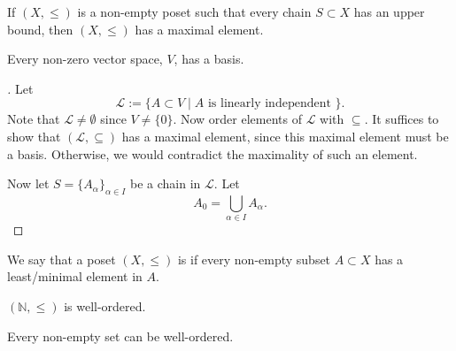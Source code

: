 \documentclass[notoc,notitlepage]{tufte-book}
\begin{document}
\begin{axiom}
\label{axiom:zorn_s_lemma}
  If $(X, \leq)$ is a non-empty poset such that every chain $S \subset X$ has an upper bound, then $(X, \leq)$ has a maximal element.
\end{axiom}

\begin{thm}
\label{thm:non_zero_vector_spaces_has_a_basis}
  Every non-zero vector space, $V$, has a basis.
\end{thm}
\begin{proof}[\faStar]
  Let
  \begin{equation*}
    \mathcal{L} := \{ A \subset V \mid A \text{ is linearly independent } \}.
  \end{equation*}
  Note that $\mathcal{L} \neq \emptyset$ since $V \neq \{ 0 \}$. Now order elements of $\mathcal{L}$ with $\subseteq$. It suffices to show that $(\mathcal{L}, \subseteq)$ has a maximal element, since this maximal element must be a basis. Otherwise, we would contradict the maximality of such an element.

  Now let $S = \{ A_\alpha \}_{\alpha \in I}$ be a chain in $\mathcal{L}$. Let
  \begin{equation*}
    A_0 = \bigcup_{\alpha \in I} A_\alpha.
  \end{equation*}
\end{proof}

\begin{defn}
\label{defn:well_ordered}
\noindent We say that a poset $(X, \leq)$ is  if every non-empty subset $A \subset X$ has a least/minimal element in $A$.
\end{defn}

\begin{eg}
  $(\mathbb{N}, \leq)$ is well-ordered.
\end{eg}

\begin{axiom}
\label{axiom:well_ordering_principle}
  Every non-empty set can be well-ordered.
\end{axiom}
\end{document}
